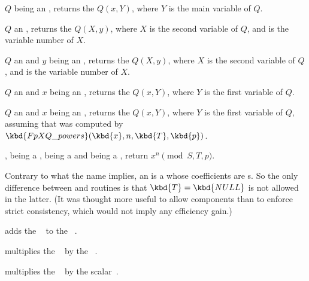  $Q$ being an , returns the
 $Q(x,Y)$, where $Y$ is the main variable of $Q$.

 $Q$ an , returns
the  $Q(X,y)$, where $X$ is the second variable of $Q$, and 
is the variable number of $X$.

 $Q$ an 
and $y$ being an , returns the  $Q(X,y)$, where $X$ is the
second variable of $Q$, and  is the variable number of $X$.

 $Q$ an  and
$x$ being an , returns the  $Q(x,Y)$, where $Y$ is the
first variable of $Q$.

 $Q$ an  and
$x$ being an , returns the  $Q(x,Y)$, where $Y$ is the
first variable of $Q$, assuming that  was computed by
$\kbd{FpXQ\_powers}(\kbd{x}, n, \kbd{T}, \kbd{p})$.

,  being a
,  being a  and  being a ,
return $x^n \pmod{S,T,p}$.

Contrary to what the name implies, an  is a  whose
coefficients are s. So the only difference between  and
 routines is that $\kbd{T} = \kbd{NULL}$ is not allowed in the
latter. (It was thought more useful to allow  components than to
enforce strict consistency, which would not imply any efficiency gain.)



 adds the
~ to the ~.




 multiplies the
~ by the ~.

 multiplies the
~ by the scalar~.

